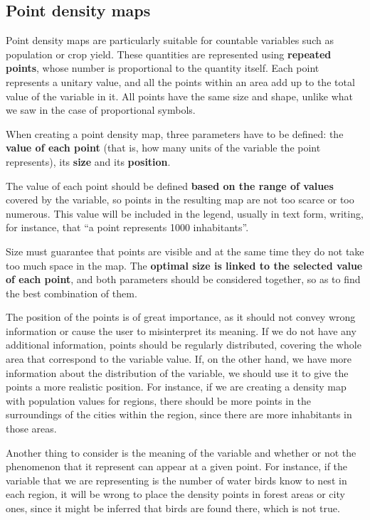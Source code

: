 \subsection{Point density maps}

Point density maps are particularly suitable for countable variables such as population or crop yield. These quantities are represented using \textbf{repeated points}, whose number is proportional to the quantity itself. Each point represents a unitary value, and all the points within an area add up to the total value of the variable in it. All points have the same size and shape, unlike what we saw in the case of proportional symbols.

When creating a point density map, three parameters have to be defined: the \textbf{value of each point} (that is, how many units of the variable the point represents), its \textbf{size} and its \textbf{position}.

The value of each point should be defined \textbf{based on the range of values} covered by the variable, so points in the resulting map are not too scarce or too numerous. This value will be included in the legend, usually in text form, writing, for instance, that ``a point represents 1000 inhabitants''.

Size must guarantee that points are visible and at the same time they do not take too much space in the map. The \textbf{optimal size is linked to the selected value of each point}, and both parameters should be considered together, so as to find the best combination of them. 

The position of the points is of great importance, as it should not convey wrong information or cause the user to misinterpret its meaning. If we do not have any additional information, points should be regularly distributed, covering the whole area that correspond to the variable value. If, on the other hand, we have more information about the distribution of the variable, we should use it to give the points a more realistic position. For instance, if we are creating a density map with population values for regions, there should be more points in the surroundings of the cities within the region, since there are more inhabitants in those areas.

Another thing to consider is the meaning of the variable and whether or not the phenomenon that it represent can appear at a given point. For instance, if the variable that we are representing is the number of water birds know to nest in each region, it will be wrong to place the density points in forest areas or city ones, since it might be inferred that birds are found there, which is not true.

